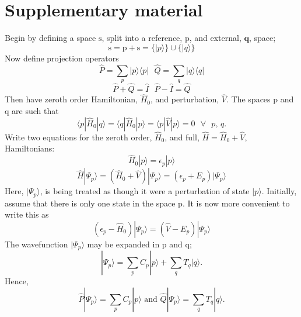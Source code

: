 \documentclass[12pt]{article}
\begin{document}
\section{ Supplementary material }
Begin by defining a space $\mathrm{s}$, split into a reference, $\mathrm{p}$, and external, $\mathbf{q}$, space;
\begin{equation}
\mathrm{s} = \mathrm{p} + \mathrm{s} = \{ |p\rangle \} \cup \{|q\rangle \}
\end{equation}
Now define projection operators
\begin{equation}
\hat{P} =\sum_{p} |p\rangle \langle p | 
\text{ \ \ \ \ \ \ \ \ \ }
\hat{Q} =\sum_{q} |q\rangle \langle q | 
\end{equation}
\begin{equation}
\hat{P}+\hat{Q} = \hat{I}
\text{\ \ \ \ \ \ \ \ \ }
\hat{P}-\hat{I} = \hat{Q}
\end{equation}
Then have zeroth order Hamiltonian, $\hat{H}_{0}$, and perturbation, $\hat{V}$. The spaces $\mathrm{p}$ and $\mathrm{q}$ are such that
\begin{equation}
\langle p | \hat{H}_{0} | q \rangle  = 
\langle q | \hat{H}_{0} | p \rangle  = 
\langle p | \hat{V} | p \rangle  =  0 \text{ \ \ \ } \forall \text{ \ }p\text{,\ }q  . 
\label{eqn:space_props}
\end{equation}
Write two equations for the zeroth order, $\hat{H}_{0}$, and full, $\hat{H} = \hat{H}_{0} + \hat{V}$, Hamiltonians:
\begin{equation}
\hat{H}_{0} | p \rangle  = \epsilon_{p} |p \rangle
\end{equation}
\begin{equation}
\hat{H}|\Psi_{p} \rangle =( \hat{H}_{0}+\hat{V} )| \Psi_{p} \rangle  = (\epsilon_{p}+E_{p})|\Psi_{p} \rangle
\end{equation}
Here, $|\Psi_{p}\rangle$, is being treated as though it were a perturbation of state $|p\rangle$. Initially, 
assume that there is only one state in the space $\mathrm{p}$. It is now more convenient to write this as
\begin{equation}
(\epsilon_{p}-\hat{H}_{0} )| \Psi_{p} \rangle  = (\hat{V}-E_{p})|\Psi_{p} \rangle
\end{equation}
The wavefunction $|\Psi_{p} \rangle$ may be expanded in $\mathrm{p}$ and $\mathrm{q}$;
\begin{equation}
| \Psi_{p} \rangle  = \sum_{p} C_{p}|p\rangle + \sum_{q} T_{q}|q\rangle.
\end{equation}
Hence,
\begin{equation}
\hat{P} | \Psi_{p} \rangle  = \sum_{p} C_{p}|p\rangle
\text{ \ \ \ \  and \ \ \ \ }
\hat{Q} | \Psi_{p} \rangle  = \sum_{q} T_{q}|q\rangle .
\end{equation}
\end{document}
